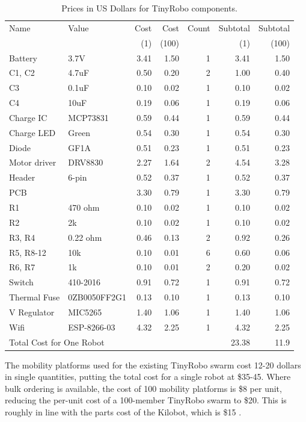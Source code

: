 \begin{table}
	\begin{tabular}{l l r r r r r}
		Name & Value & Cost & Cost & Count & Subtotal & Subtotal\\
		& & (1) & (100) & & (1) & (100)\\
		\hline
		Battery & 3.7V & 3.41 & 1.50 & 1 & 3.41 & 1.50\\
		C1, C2 & 4.7uF & 0.50 & 0.20 & 2 & 1.00 & 0.40\\
		C3 & 0.1uF & 0.10 & 0.02 & 1 & 0.10 & 0.02\\
		C4 & 10uF & 0.19 & 0.06 & 1 & 0.19 & 0.06\\
		Charge IC & MCP73831 & 0.59 & 0.44 & 1 & 0.59 & 0.44\\
		Charge LED & Green & 0.54 & 0.30 & 1 & 0.54 & 0.30\\
		Diode & GF1A & 0.51 & 0.23 & 1 & 0.51 & 0.23\\
		Motor driver & DRV8830 & 2.27 & 1.64 & 2 & 4.54 & 3.28\\
		Header & 6-pin  & 0.52 & 0.37 & 1 & 0.52 & 0.37\\
		PCB &  & 3.30 & 0.79 & 1 & 3.30 & 0.79\\
		R1 & 470 ohm & 0.10 & 0.02 & 1 & 0.10 & 0.02\\
		R2 & 2k & 0.10 & 0.02 & 1 & 0.10 & 0.02\\
		R3, R4 & 0.22 ohm & 0.46 & 0.13 & 2 & 0.92 & 0.26\\
		R5, R8-12 & 10k & 0.10 & 0.01 & 6 & 0.60 & 0.06\\
		R6, R7 & 1k & 0.10 & 0.01 & 2 & 0.20 & 0.02\\
		Switch & 410-2016 & 0.91 & 0.72 & 1 & 0.91 & 0.72\\
		Thermal Fuse & 0ZB0050FF2G1 & 0.13 & 0.10 & 1 & 0.13 & 0.10\\
		V Regulator & MIC5265 & 1.40 & 1.06 & 1 & 1.40 & 1.06\\
		Wifi & ESP-8266-03 & 4.32 & 2.25 & 1 & 4.32 & 2.25\\
		\hline
		\multicolumn{2}{l}{Total Cost for One Robot} &  &  &  & 23.38 & 11.9\\
	\end{tabular}
	\caption{Prices in US Dollars for TinyRobo components.}
\end{table}

The mobility platforms used for the existing TinyRobo swarm cost 12-20 dollars in single quantities, putting the total cost for a single robot at \$35-45.
Where bulk ordering is available, the cost of 100 mobility platforms is \$8 per unit, reducing the per-unit cost of a 100-member TinyRobo swarm to \$20. 
This is roughly in line with the parts cost of the Kilobot, which is \$15 \citep{rubenstein2014kilobot}.

